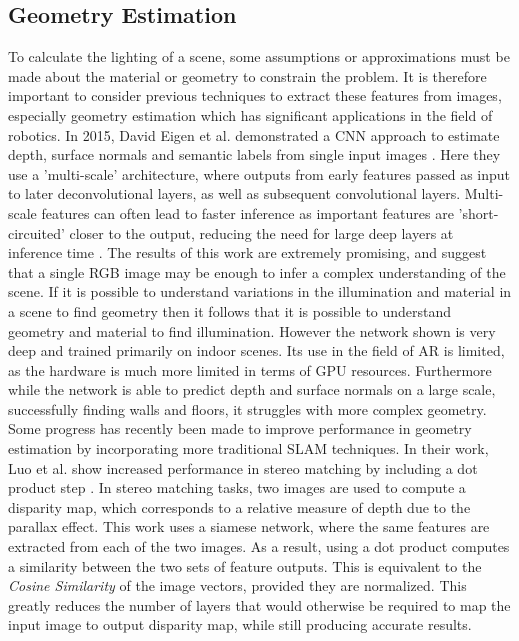 \documentclass[ %
                    author={Gavin Parker},
                supervisor={Dr. Neill Campbell},
                    degree={MEng},
                     title={Deep Siamese Networks for Illumination Estimation from Stereo Images},
                  subtitle={},
                      type={research},
                      year={2018} ]{dissertation}
\begin{document}
\subsection{Geometry Estimation}
To calculate the lighting of a scene, some assumptions or approximations must be made about the material or geometry to constrain the problem. It is therefore important to consider previous techniques to extract these features from images, especially geometry estimation which has significant applications in the field of robotics. In 2015, David Eigen et al. demonstrated a CNN approach to estimate depth, surface normals and semantic labels from single input images \cite{7410661}. Here they use a 'multi-scale' architecture, where outputs from early features passed as input to later deconvolutional layers, as well as subsequent convolutional layers. Multi-scale features can often lead to faster inference as important features are 'short-circuited' closer to the output, reducing the need for large deep layers at inference time . The results of this work are extremely promising, and suggest that a single RGB image may be enough to infer a complex understanding of the scene. If it is possible to understand variations in the illumination and material in a scene to find geometry then it follows that it is possible to understand geometry and material to find illumination.  However the network shown is very deep and trained primarily on indoor scenes. Its use in the field of AR is limited, as the hardware is much more limited in terms of GPU resources. Furthermore while the network is able to predict depth and surface normals on a large scale, successfully finding walls and floors, it struggles with more complex geometry. Some progress has recently been made to improve performance in geometry estimation by incorporating more traditional SLAM techniques. In their work, Luo et al. show increased performance in stereo matching by including a dot product step \cite{7780983}. In stereo matching tasks, two images are used to compute a disparity map, which corresponds to a relative measure of depth due to the parallax effect. This work uses a siamese network, where the same features are extracted from each of the two images. As a result, using a dot product computes a similarity between the two sets of feature outputs. This is equivalent to the \textit{Cosine Similarity} of the image vectors, provided they are normalized. This greatly reduces the number of layers that would otherwise be required to map the input image to output disparity map, while still producing accurate results.
\end{document}
